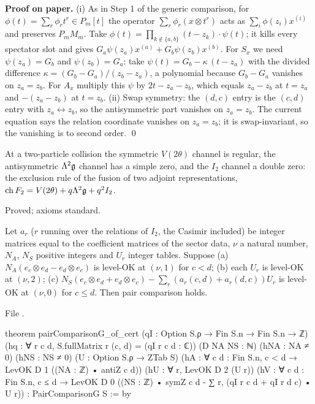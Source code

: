 \textbf{Proof on paper.} (i) As in Step 1 of the generic comparison, for $\phi(t)=\sum_r\phi_rt^r\in P_m[t]$ the operator
$\sum_r\phi_r(x\otimes t^r)$ acts as $\sum_i\phi(z_i)x^{(i)}$ and preserves $P_mM_m$. Take
$\phi(t)=\prod_{k\notin\{a,b\}}(t-z_k)\cdot\psi(t)$; it kills every spectator slot and gives $G_a\psi(z_a)x^{(a)}+G_b\psi(z_b)x^{(b)}$.
For $S_x$ we need $\psi(z_a)=G_b$ and $\psi(z_b)=G_a$: take $\psi(t)=G_b-\kappa\,(t-z_a)$ with the divided difference
$\kappa=(G_b-G_a)/(z_b-z_a)$, a polynomial because $G_b-G_a$ vanishes on $z_a=z_b$. For $A_x$ multiply this $\psi$ by
$2t-z_a-z_b$, which equals $z_a-z_b$ at $t=z_a$ and $-(z_a-z_b)$ at $t=z_b$. (ii) Swap symmetry: the $(d,c)$ entry is the $(c,d)$ entry with
$z_a\leftrightarrow z_b$, so the antisymmetric part vanishes on $z_a=z_b$. The current equation says the relation
coordinate vanishes on $z_a=z_b$; it is swap-invariant, so the vanishing is to second order. \qed

\begin{physics}
At a two-particle collision the symmetric $V(2\theta)$ channel is regular, the antisymmetric $\Lambda^2\mathfrak g$
channel has a simple zero, and the $I_2$ channel a double zero: the exclusion rule of the fusion of two adjoint
representations, $\operatorname{ch} F_2=V(2\theta)+q\Lambda^2\mathfrak g+q^2I_2$.
\end{physics}

\begin{status}
Proved; axioms standard.
\end{status}

\begin{theorem}\label{l24:thm:cert}
Let $a_r$ ($r$ running over the relations of $I_2$, the Casimir included) be integer matrices equal to the coefficient
matrices of the sector data, $\nu$ a natural number, $N_A$, $N_S$ positive integers and $U_r$ integer tables.
Suppose (a) $N_A(e_c\otimes e_d-e_d\otimes e_c)$ is level-OK at $(\nu,1)$ for $c<d$; (b) each $U_r$ is level-OK at $(\nu,2)$;
(c) $N_S(e_c\otimes e_d+e_d\otimes e_c)-\sum_r(a_r(c,d)+a_r(d,c))U_r$ is level-OK at $(\nu,0)$ for $c\le d$. Then pair
comparison holds.
\end{theorem}
\noindent File .
\begin{leancode}
theorem pairComparisonG_of_cert (qI : Option S.ρ → Fin S.n → Fin S.n → ℤ)
    (hq : ∀ r c d, S.fullMatrix r (c, d) = (qI r c d : ℂ)) (D NA NS : ℕ) (hNA : NA ≠ 0)
    (hNS : NS ≠ 0) (U : Option S.ρ → ZTab S)
    (hA : ∀ c d : Fin S.n, c < d → LevOK D 1 ((NA : ℤ) • antiZ c d))
    (hU : ∀ r, LevOK D 2 (U r))
    (hV : ∀ c d : Fin S.n, c ≤ d →
      LevOK D 0 ((NS : ℤ) • symZ c d - ∑ r, (qI r c d + qI r d c) • U r)) :
    PairComparisonG S := by
\end{leancode}

